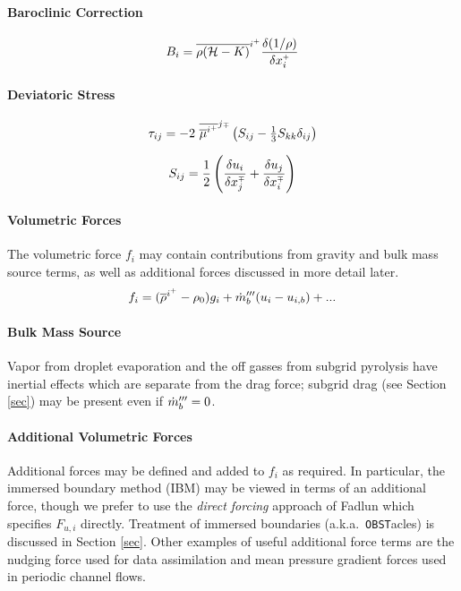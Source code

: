 \documentclass[11pt]{article}
\begin{document}
\paragraph{Baroclinic Correction}
\begin{equation}
B_i = \overline{\rho({\cal H} - K)}^{i^{\scriptscriptstyle +}} \frac{\delta (1/\rho)}{\delta x_i^{\scriptscriptstyle +}}
\end{equation}

\paragraph{Deviatoric Stress}

\begin{equation}
\label{eqn_deviatoric_stress}
\tau_{ij} = -2 \,\,\overline{\overline{\mu}^{i^+}}^{j{\scriptscriptstyle \mp}} \left( S_{ij} - \mbox{$\frac{1}{3}$} S_{kk} \delta_{ij} \right)
\end{equation}

\begin{equation}
\label{eqn_strain_tensor}
S_{ij} = \frac{1}{2}\left( \frac{\delta u_i}{\delta x_j^{\scriptscriptstyle \mp}} + \frac{\delta u_j}{\delta x_i^{\scriptscriptstyle \mp}} \right)
\end{equation}

\paragraph{Volumetric Forces} The volumetric force $f_i$ may contain contributions from gravity and bulk mass source terms, as well as additional forces discussed in more detail later.
\begin{equation}
f_i = (\overline{\rho}^{i^+}-\rho_0)g_i + \dot{m}_b^{\prime\prime\prime}(u_i-u_{i,b}) + ...
\end{equation}

\paragraph{Bulk Mass Source} Vapor from droplet evaporation and the off gasses from subgrid pyrolysis have inertial effects which are separate from the drag force; subgrid drag (see Section \ref{sec}) may be present even if $\dot{m}_b^{\prime\prime\prime}=0$.

\paragraph{Additional Volumetric Forces} Additional forces may be defined and added to $f_i$ as required.  In particular, the immersed boundary method (IBM) may be viewed in terms of an additional force, though we prefer to use the \emph{direct forcing} approach of Fadlun \cite{Fadlun} which specifies $F_{u,i}$ directly. Treatment of immersed boundaries (a.k.a.~{\tt OBST}acles) is discussed in Section \ref{sec}.  Other examples of useful additional force terms are the nudging force used for data assimilation and mean pressure gradient forces used in periodic channel flows.
\end{document}
